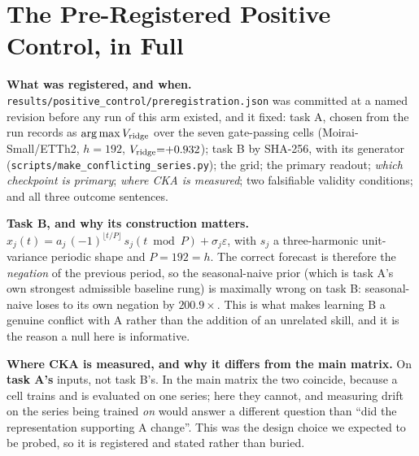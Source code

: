 \section{The Pre-Registered Positive Control, in Full}
\label{app:poscontrol}

\textbf{What was registered, and when.}
\texttt{results/positive\_control/\allowbreak preregistration.json} was committed at a named
revision before any run of this arm existed, and it fixed: task A, chosen from the
run records as $\arg\max V_{\text{ridge}}$ over the seven gate-passing cells
(Moirai-Small/ETTh2, $h{=}192$, $V_{\text{ridge}}{=}{+}0.932$); task B by
SHA-256, with its generator (\texttt{scripts/make\_conflicting\_series.py}); the
grid; the primary readout; \emph{which checkpoint is primary}; \emph{where CKA is
measured}; two falsifiable validity conditions; and all three outcome sentences.

\textbf{Task B, and why its construction matters.} $x_j(t) = a_j\,(-1)^{\lfloor
t/P\rfloor}\,s_j(t \bmod P) + \sigma_j\varepsilon$, with $s_j$ a three-harmonic
unit-variance periodic shape and $P{=}192{=}h$.  The correct forecast is
therefore the \emph{negation} of the previous period, so the seasonal-naive
prior (which is task A's own strongest admissible baseline rung) is maximally
wrong on task B: seasonal-naive loses to its own negation by $200.9\times$.  This
is what makes learning B a genuine conflict with A rather than the addition of an
unrelated skill, and it is the reason a null here is informative.

\textbf{Where CKA is measured, and why it differs from the main matrix.} On
\textbf{task A's} inputs, not task B's.  In the main matrix the two coincide,
because a cell trains and is evaluated on one series; here they cannot, and
measuring drift on the series being trained \emph{on} would answer a different
question than ``did the representation supporting A change''.  This was the
design choice we expected to be probed, so it is registered and stated rather
than buried.

